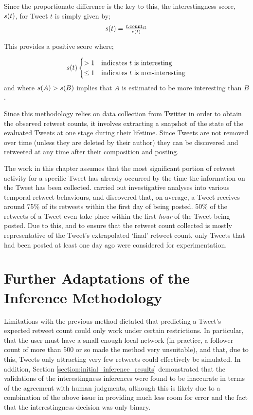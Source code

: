 Since the proportionate difference is the key to this, the interestingness score, $s(t)$, for Tweet $t$ is simply given by;
\[
\begin{array}{cc}
    s(t) = \frac{t.\textrm{count}_R}{e(t)}
\end{array}
\]

This provides a positive score where;

\[
s(t)
\begin{cases}
    > 1		&	\text{indicates } t	\text{ is interesting} \\
    \leq 1	&	\text{indicates } t	\text{ is non-interesting}
\end{cases}
\]
and where $s(A) > s(B)$ implies that $A$ is estimated to be more interesting than $B$.

Since this methodology relies on data collection from Twitter in order to obtain the observed retweet counts, it involves extracting a snapshot of the state of the evaluated Tweets at one stage during their lifetime. Since Tweets are not removed over time (unless they are deleted by their author) they can be discovered and retweeted at any time after their composition and posting.

The work in this chapter assumes that the most significant portion of retweet activity for a specific Tweet has already occurred by the time the information on the Tweet has been collected. \citet{kwak10} carried out investigative analyses into various temporal retweet behaviours, and discovered that, on average, a Tweet receives around 75\% of its retweets within the first day of being posted. 50\% of the retweets of a Tweet even take place within the first \textit{hour} of the Tweet being posted. Due to this, and to ensure that the retweet count collected is mostly representative of the Tweet's extrapolated `final' retweet count, only Tweets that had been posted at least one day ago were considered for experimentation.


\section{Further Adaptations of the Inference Methodology}
Limitations with the previous method dictated that predicting a Tweet's expected retweet count could only work under certain restrictions. In particular, that the user must have a small enough local network (in practice, a follower count of more than 500 or so made the method very unsuitable), and that, due to this, Tweets only attracting very few retweets could effectively be simulated. In addition, Section \ref{section:initial_inference_results} demonstrated that the validations of the interestingness inferences were found to be inaccurate in terms of the agreement with human judgments, although this is likely due to a combination of the above issue in providing much less room for error and the fact that the interestingness decision was only binary.

